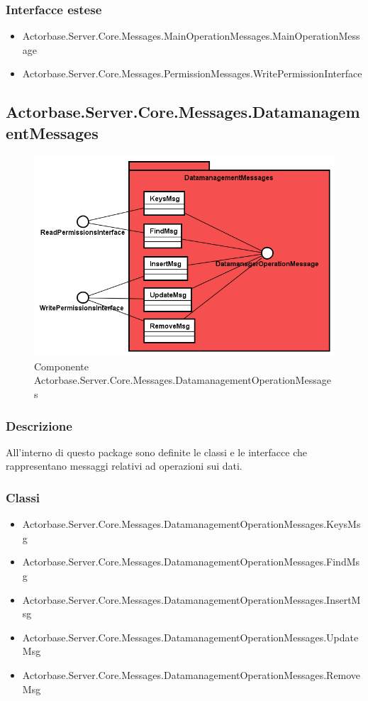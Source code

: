 \documentclass[a4paper]{article}
\begin{document}
			\subsubsection{Interfacce estese}
			\begin{itemize}
				\item Actorbase.Server.Core.Messages.MainOperationMessages.MainOperationMessage
				\item Actorbase.Server.Core.Messages.PermissionMessages.WritePermissionInterface
			\end{itemize}
			
		\subsection{Actorbase.Server.Core.Messages.DatamanagementMessages}
			\begin{figure} [H]
			\centering
			\includegraphics[scale=0.50]{Server/Package/DatamanagementMessagesLevel.png}
			\caption{Componente Actorbase.Server.Core.Messages.DatamanagementOperationMessages}
			\end{figure}
			\subsubsection{Descrizione}
				All'interno di questo package sono definite le classi e le interfacce che rappresentano messaggi relativi ad operazioni sui dati.
			\subsubsection{Classi}
			\begin{itemize}
				\item Actorbase.Server.Core.Messages.DatamanagementOperationMessages.KeysMsg
				\item Actorbase.Server.Core.Messages.DatamanagementOperationMessages.FindMsg
				\item Actorbase.Server.Core.Messages.DatamanagementOperationMessages.InsertMsg
				\item Actorbase.Server.Core.Messages.DatamanagementOperationMessages.UpdateMsg
				\item Actorbase.Server.Core.Messages.DatamanagementOperationMessages.RemoveMsg
			\end{itemize}
\end{document}
